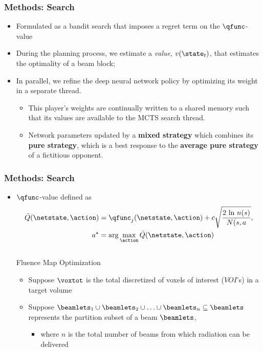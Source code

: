 \begin{frame}
	\frametitle{Methods: Search}
	\begin{itemize}
		\item Formulated as a bandit search that imposes a regret term on the $\qfunc$-value
		\item During the planning process, we estimate a \textit{value}, $v(\state_t)$, that estimates the optimality of a beam block; 
		\item In parallel, we refine the deep neural network policy by optimizing its weight in a separate thread. 
		\begin{itemize}
			\item This player's weights are continually written to a shared memory such that its values are available to the MCTS search thread. 
			\item Network parameters updated  by a \textbf{mixed strategy} which combines its \textbf{pure strategy}, which is a best response to the \textbf{average pure strategy} of a fictitious opponent.
		\end{itemize}
	\end{itemize}
\end{frame}

\begin{frame}
\frametitle{Methods: Search}
\begin{itemize}
	\item $\qfunc$-value defined as 	
	\begin{align}
	\bar{Q}(\netstate, \action) &= \qfunc_j(\netstate, \action) + c  \sqrt{\dfrac{2 \text{ ln} \,\, n(s)}{N(s,a}}, \\
	a^\star &= \arg \max_\action \bar{Q}(\netstate, \action)
	\label{eq:upper_conf}
	\end{align}
	\hrulefill \\
	Fluence Map Optimization
	\begin{itemize}
		\item Suppose $\voxtot$ is the total discretized of voxels of interest ($VOI$'s) in a target volume
		\item Suppose $\beamlets_1 \cup \beamlets_2 \cup \ldots \cup \beamlets_n \subseteq \beamlets$ represents the partition subset of a  beam $\beamlets$, 
		\begin{itemize}
			\item where $n$ is the total number of beams from which radiation can be delivered
		\end{itemize}
	\end{itemize}
\end{itemize}
\end{frame}

